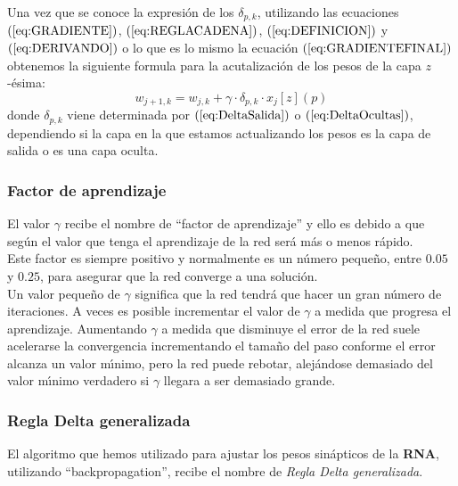Una vez que se conoce la expresi\'on de los $\delta_{p,k}$, utilizando las
ecuaciones $(\ref{eq:GRADIENTE})$, $(\ref{eq:REGLACADENA})$,
$(\ref{eq:DEFINICION})$ y $(\ref{eq:DERIVANDO})$ o lo que es lo mismo la
ecuaci\'on $(\ref{eq:GRADIENTEFINAL})$ obtenemos la siguiente formula para la
acutalizaci\'on de los pesos de la capa $z$-\'esima:
\begin{displaymath}
w_{j+1,k}=w_{j,k}+\gamma \cdot \delta_{p,k}\cdot x_j[z](p)
\end{displaymath}
donde $\delta_{p,k}$ viene determinada por $(\ref{eq:DeltaSalida})$ o
$(\ref{eq:DeltaOcultas})$, dependiendo si la capa en la que estamos 
actualizando los pesos es la capa de salida o es una capa oculta.
%
\newpage
%
\subsubsection{Factor de aprendizaje}

El valor $\gamma$ recibe el nombre de ``factor de aprendizaje'' y ello es 
debido a que seg\'un el valor que tenga el aprendizaje de la red ser\'a m\'as o
menos r\'apido.\\

Este factor es siempre positivo y normalmente es un n\'umero peque\~no, entre
$0.05$ y $0.25$, para asegurar que la red converge a una soluci\'on.\\

Un valor peque\~no de $\gamma$ significa que la red tendr\'a que hacer un gran
n\'umero de iteraciones. A veces es posible incrementar el valor de $\gamma$ a
medida que progresa el aprendizaje. Aumentando $\gamma$ a medida que disminuye
el error de la red suele acelerarse la convergencia incrementando el tama\~no
del paso conforme el error alcanza un valor m\'{\i}nimo, pero la red puede
rebotar, alej\'andose demasiado del valor m\'{\i}nimo verdadero si $\gamma$
llegara a ser demasiado grande.

\subsubsection{Regla Delta generalizada}

El algoritmo que hemos utilizado para ajustar los pesos sin\'apticos de la
\textbf{RNA}, utilizando ``backpropagation'', recibe el nombre de
\emph{Regla Delta generalizada}.
